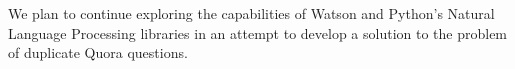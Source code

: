 \documentclass{sig-alternate}
\begin{document}
We plan to continue exploring the capabilities of Watson and Python's Natural Language Processing libraries in an attempt to develop a solution to the problem of duplicate Quora questions.



\balance
\end{document}
